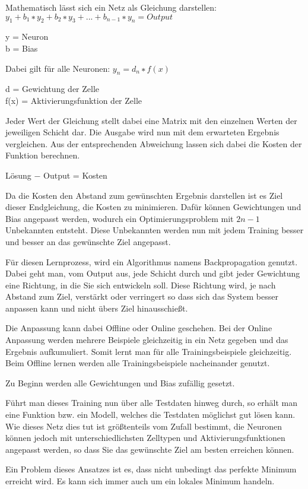\documentclass[
]{article}
\begin{document}
Mathematisch lässt sich ein Netz als Gleichung darstellen: \\
\(y_1 + b_1 ∗ y_2 + b_2 ∗ y_3 + . . . + b_{n−1} ∗ y_n = Output\)

y = Neuron\\
b = Bias

Dabei gilt für alle Neuronen: \(y_n = d_n ∗f(x)\)

d = Gewichtung der Zelle\\
f(x) = Aktivierungsfunktion der Zelle

Jeder Wert der Gleichung stellt dabei eine Matrix mit den einzelnen
Werten der jeweiligen Schicht dar. Die Ausgabe wird nun mit dem
erwarteten Ergebnis vergleichen. Aus der entsprechenden Abweichung
lassen sich dabei die Kosten der Funktion berechnen.

Lösung − Output = Kosten

Da die Kosten den Abstand zum gewünschten Ergebnis darstellen ist es
Ziel dieser Endgleichung, die Kosten zu minimieren. Dafür können
Gewichtungen und Bias angepasst werden, wodurch ein Optimierungsproblem
mit \(2n-1\) Unbekannten entsteht. Diese Unbekannten werden nun mit
jedem Training besser und besser an das gewünschte Ziel angepasst.

Für diesen Lernprozess, wird ein Algorithmus namens Backpropagation
genutzt. Dabei geht man, vom Output aus, jede Schicht durch und gibt
jeder Gewichtung eine Richtung, in die Sie sich entwickeln soll. Diese
Richtung wird, je nach Abstand zum Ziel, verstärkt oder verringert so
dass sich das System besser anpassen kann und nicht übers Ziel
hinausschießt.

Die Anpassung kann dabei Offline oder Online geschehen. Bei der Online
Anpassung werden mehrere Beispiele gleichzeitig in ein Netz gegeben und
das Ergebnis aufkumuliert. Somit lernt man für alle Trainingsbeispiele
gleichzeitig. Beim Offline lernen werden alle Trainingsbeispiele
nacheinander genutzt.

Zu Beginn werden alle Gewichtungen und Bias zufällig gesetzt.

Führt man dieses Training nun über alle Testdaten hinweg durch, so
erhält man eine Funktion bzw. ein Modell, welches die Testdaten
möglichst gut lösen kann. Wie dieses Netz dies tut ist größtenteils vom
Zufall bestimmt, die Neuronen können jedoch mit unterschiedlichsten
Zelltypen und Aktivierungsfunktionen angepasst werden, so dass Sie das
gewünschte Ziel am besten erreichen können.

Ein Problem dieses Ansatzes ist es, dass nicht unbedingt das perfekte
Minimum erreicht wird. Es kann sich immer auch um ein lokales Minimum
handeln.
\end{document}
